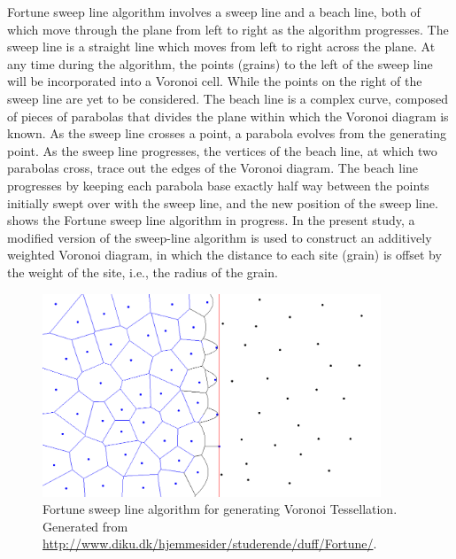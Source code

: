Fortune sweep line algorithm involves a sweep line and a beach line, both of 
which move through the plane from left to right as the algorithm progresses. 
The sweep line is a straight line which moves from left to right across the 
plane. At any time during the algorithm, the points (grains) to the left of the 
sweep line will be incorporated into a Voronoi cell. While the points on the 
right of the sweep line are yet to be considered. The beach line is a complex 
curve, composed of pieces of parabolas that divides the plane within which the 
Voronoi diagram is known. As the sweep line crosses a point, a parabola 
evolves from the generating point. As the sweep line progresses, the 
vertices of the beach line, at which two parabolas cross, trace out the edges 
of the Voronoi diagram. The beach line progresses by keeping each parabola base 
exactly half way between the points initially swept over with the sweep line, 
and the new position of the sweep line.~ shows the Fortune 
sweep line algorithm in progress. In the present study, a modified version of 
the sweep-line algorithm is used to construct an additively weighted Voronoi 
diagram, in which the distance to each site (grain) is offset by the weight of 
the site, i.e., the radius of the grain.

\begin{figure}[tbhp]
\centering
\includegraphics[width=0.9\textwidth]{sweep_voro}
\caption[Fortune sweep line algorithm for generating Voronoi 
Tessellation]{Fortune sweep line algorithm for generating Voronoi Tessellation. 
Generated from \url{http://www.diku.dk/hjemmesider/studerende/duff/Fortune/}.}
\label{fig:sweep_voro}
\end{figure}

